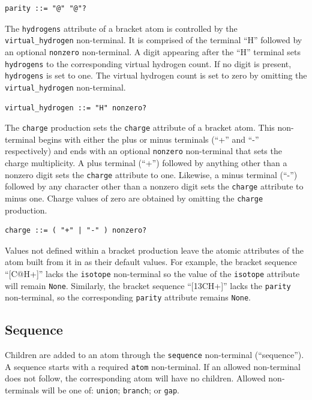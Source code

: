 \documentclass{article}
\def\ttt{\texttt}
\begin{document}
\begin{lstlisting}
parity ::= "@" "@"?
\end{lstlisting}

The \ttt{hydrogens} attribute of a bracket atom is controlled by the \\ \ttt{virtual{\_}hydrogen} non-terminal. It is comprised of the terminal \enquote{H} followed by an optional \ttt{nonzero} non-terminal. A digit appearing after the \enquote{H} terminal sets \ttt{hydrogens} to the corresponding virtual hydrogen count. If no digit is present, \ttt{hydrogens} is set to one. The virtual hydrogen count is set to zero by omitting the \ttt{virtual{\_}hydrogen} non-terminal.

\begin{lstlisting}
virtual_hydrogen ::= "H" nonzero?
\end{lstlisting}

The \ttt{charge} production sets the \ttt{charge} attribute of a bracket atom. This non-terminal begins with either the plus or minus terminals (\enquote{+} and \enquote{-} respectively) and ends with an optional \ttt{nonzero} non-terminal that sets the charge multiplicity. A plus terminal (\enquote{+}) followed by anything other than a nonzero digit sets the \ttt{charge} attribute to one. Likewise, a minus terminal (\enquote{-}) followed by any character other than a nonzero digit sets the \ttt{charge} attribute to minus one. Charge values of zero are obtained by omitting the \ttt{charge} production.

\begin{lstlisting}
charge ::= ( "+" | "-" ) nonzero?
\end{lstlisting}

Values not defined within a bracket production leave the atomic attributes of the atom built from it in as their default values. For example, the bracket sequence \enquote{[C@H+]} lacks the \ttt{isotope} non-terminal so the value of the \ttt{isotope} attribute will remain \ttt{None}. Similarly, the bracket sequence \enquote{[13CH+]} lacks the \ttt{parity} non-terminal, so the corresponding \ttt{parity} attribute remains \ttt{None}.

\subsection*{Sequence}

Children are added to an atom through the \ttt{sequence} non-terminal (\enquote{sequence}). A sequence starts with a required \ttt{atom} non-terminal. If an allowed non-terminal does not follow, the corresponding atom will have no children. Allowed non-terminals will be one of: \ttt{union}; \ttt{branch}; or \ttt{gap}.
\end{document}
